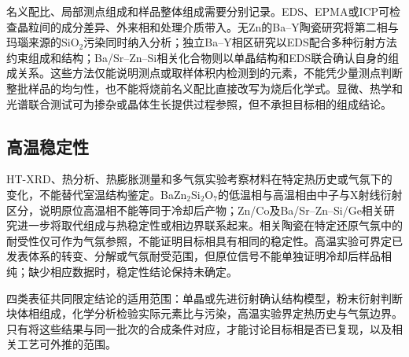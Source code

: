 名义配比、局部测点组成和样品整体组成需要分别记录。EDS、EPMA或ICP可检查晶粒间的成分差异、外来相和处理介质带入。无Zn的Ba--Y陶瓷研究将第二相与玛瑙来源的$\mathrm{SiO_2}$污染同时纳入分析\cite{yamane2024microstructure}；独立Ba--Y相区研究以EDS配合多种衍射方法约束组成和结构\cite{gulay2024navigation}；Ba\slash Sr--Zn--Si相关化合物则以单晶结构和EDS联合确认自身的组成关系\cite{thieme2015ba1}。这些方法仅能说明测点或取样体积内检测到的元素，不能凭少量测点判断整批样品的均匀性，也不能将烧前名义配比直接改写为烧后化学式。显微、热学和光谱联合测试可为掺杂或晶体生长提供过程参照，但不承担目标相的组成结论\cite{tejas2024structural,pang2005study}。

\subsection{高温稳定性}

HT\nobreakdash-XRD、热分析、热膨胀测量和多气氛实验考察材料在特定热历史或气氛下的变化，不能替代室温结构鉴定。BaZn$_2$Si$_2$O$_7$的低温相与高温相由中子与X射线衍射区分，说明原位高温相不能等同于冷却后产物\cite{lin1999phase}；Zn\slash Co及Ba\slash Sr--Zn--Si\slash Ge相关研究进一步将取代组成与热稳定性或相边界联系起来\cite{kerstan2013bazn2si2o7,thieme2016negative}。相关陶瓷在特定还原气氛中的耐受性仅可作为气氛参照，不能证明目标相具有相同的稳定性\cite{zou2019anti}。高温实验可界定已发表体系的转变、分解或气氛耐受范围，但原位信号不能单独证明冷却后样品相纯；缺少相应数据时，稳定性结论保持未确定。

四类表征共同限定结论的适用范围：单晶或先进衍射确认结构模型，粉末衍射判断块体相组成，化学分析检验实际元素比与污染，高温实验界定热历史与气氛边界。只有将这些结果与同一批次的合成条件对应，才能讨论目标相是否已复现，以及相关工艺可外推的范围。
